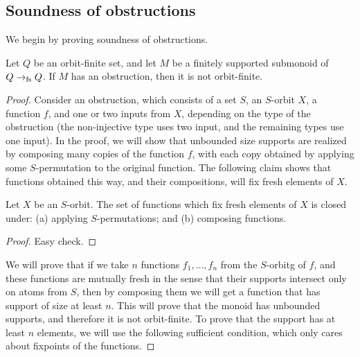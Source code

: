\subsection{Soundness of obstructions}
\label{sec:soundness-of-obstructions}
We begin by proving soundness of obstructions.
\begin{lemma}[Soundness]
    Let $Q$ be an orbit-finite set, and let $M$ be a finitely supported submonoid of $Q \to_{\text{fs}} Q$.
    If $M$ has an obstruction, then it is not orbit-finite.
\end{lemma}
\begin{proof}
Consider an obstruction, which consists of a set $S$, an $S$-orbit $X$, a function $f$, and one or two inputs from $X$, depending on the type of the obstruction (the non-injective type uses two input, and the remaining types use one input).
In the proof, we will show that unbounded size supports are realized by composing many  copies of the function $f$, with each copy obtained by  applying some $S$-permutation to the original function. The following claim shows that functions obtained this way, and their compositions, will fix fresh elements of $X$.

\begin{claim}\label{claim:fixes-fresh-closure-properties}
    Let $X$ be an $S$-orbit. The set of functions which fix fresh elements of $X$ is closed under: (a) applying $S$-permutations; and (b) composing functions. 
\end{claim}
\begin{proof}
    Easy check.
\end{proof}

We will prove that if we take $n$ functions $f_1,\ldots,f_n$ from the $S$-orbitg of $f$,  and these functions  are mutually fresh in the sense that their supports intersect only on atoms from $S$, then by composing them we will get a function that has  support of size at least $n$. This will prove that the monoid has unbounded supports, and therefore it is not orbit-finite. To prove that the support has at least $n$ elements, we will use the following sufficient condition, which only cares about fixpoints of the functions.


\end{proof}
